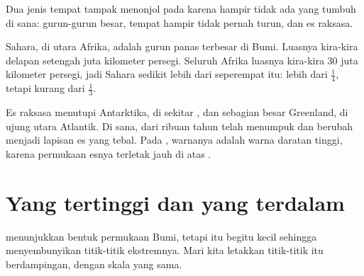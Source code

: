 Dua jenis tempat tampak menonjol pada  karena hampir tidak ada yang
tumbuh di sana: gurun-gurun besar, tempat  hampir tidak pernah turun, dan
es raksasa.

Sahara, di utara Afrika, adalah gurun panas terbesar di Bumi. Luasnya
kira-kira delapan setengah juta kilometer persegi. Seluruh Afrika luasnya
kira-kira 30 juta kilometer persegi, jadi Sahara sedikit lebih dari
seperempat  itu: lebih dari $\frac{1}{4}$, tetapi kurang dari
$\frac{1}{3}$.

Es raksasa menutupi Antarktika, di sekitar , dan sebagian besar
Greenland, di ujung utara  Atlantik. Di sana,  dari ribuan tahun
telah menumpuk dan berubah menjadi lapisan es yang tebal. Pada ,
warnanya adalah warna daratan tinggi, karena permukaan esnya terletak jauh
di atas .

\section{Yang tertinggi dan yang terdalam}

 menunjukkan bentuk permukaan Bumi, tetapi  itu begitu kecil
sehingga menyembunyikan titik-titik ekstremnya. Mari kita letakkan
titik-titik itu berdampingan, dengan skala yang sama.

